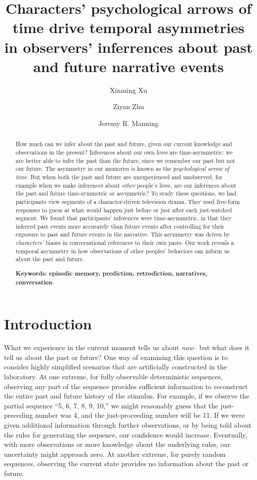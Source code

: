 \documentclass[10pt]{article}
\title{\Large Characters' psychological arrows of time drive temporal asymmetries in observers' inferrences about past and future narrative events}
\author[1]{Xinming Xu}
\author[2]{Ziyan Zhu}
\author[1, $\star$]{Jeremy R. Manning}
\affil[1]{Dartmouth College, Hanover, NH, USA}
\affil[2]{Peking University, Beijing, China}
\affil[$\star$]{Address correspondence to jeremy.r.manning@dartmouth.edu}
\begin{document}
\maketitle

\begin{abstract} {\footnotesize
  How much can we infer about the past and future, given our current knowledge and observations in the present?  Inferences about our own lives are time-asymmetric: we are better able to infer the past than the future, since we remember our past but not our future.  The asymmetry in our memories is known as the \textit{psychological arrow of time}.  But when both the past and future are unexperienced and unobserved, for example when we make inferences about \textit{other} people's lives, are our inferences about the past and future time-symmetric or asymmetric?  To study these questions, we had participants view segments of a character-driven television drama.  They used free-form responses to guess at what would happen just before or just after each just-watched segment.  We found that participants' inferences were time-asymmetric, in that they inferred past events more accurately than future events after controlling for their exposure to past and future events in the narrative.  This asymmetry was driven by \textit{characters'} biases in conversational references to their own pasts.  Our work reveals a temporal asymmetry in how observations of other peoples’ behaviors can inform us about the past and future.

\textbf{Keywords: episodic memory, prediction, retrodiction, narratives, conversation}}

\end{abstract}

\section*{Introduction}

What we experience in the current moment tells us about \textit{now}-- but what does it tell us about the past or future?  One way of examining this question is to consider highly simplified scenarios that are artificially constructed in the laboratory.  At one extreme, for fully observable deterministic sequences, observing any part of the sequence provides sufficient information to reconstruct the entire past and future history of the stimulus.  For example, if we observe the partial sequence ``5, 6, 7, 8, 9, 10,'' we might reasonably guess that the just-preceding number was 4, and the just-proceeding number will be 11.  If we were given additional information through further observations, or by being told about the rules for generating the sequence, our confidence would increase.  Eventually, with more observations or more knowledge about the underlying rules, our uncertainty might approach zero.  At another extreme, for purely random sequences, observing the current state provides no information about the past or future.
\end{document}
